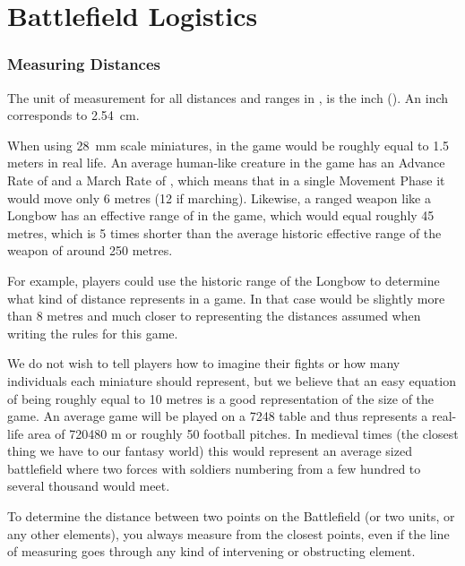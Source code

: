 
\part{Battlefield Logistics}

\RBbmc

\section{Measuring Distances}
\label{measuring_distances}

The unit of measurement for all distances and ranges in \nameofthegame{}, is the inch (\si{\inch}). An inch corresponds to \SI{2.54}{\centi\meter}.

When using \SI{28}{mm} scale miniatures,  in the game would be roughly equal to \num{1.5} meters in real life. An average human-like creature in the game has an Advance Rate of  and a March Rate of , which means that in a single Movement Phase it would move only \num{6} metres (\num{12} if marching). Likewise, a ranged weapon like a Longbow has an effective range of  in the game, which would equal roughly \num{45} metres, which is 5 times shorter than the average historic effective range of the weapon of around \num{250} metres.

For example, players could use the historic range of the Longbow to determine what kind of distance  represents in a game. In that case  would be slightly more than 8 metres and much closer to representing the distances assumed when writing the rules for this game.

We do not wish to tell players how to imagine their fights or how many individuals each miniature should represent, but we believe that an easy equation of  being roughly equal to \num{10} metres is a good representation of the size of the game. An average game will be played on a \num{72}\timess{}\num{48}\si{\inch} table and thus represents a real-life area of \num{720}\timess{}\num{480} \si{\meter} or roughly 50 football pitches. In medieval times (the closest thing we have to our fantasy world) this would represent an average sized battlefield where two forces with soldiers numbering from a few hundred to several thousand would meet.

To determine the distance between two points on the Battlefield (or two units, or any other elements), you always measure from the closest points, even if the line of measuring goes through any kind of intervening or obstructing element.

